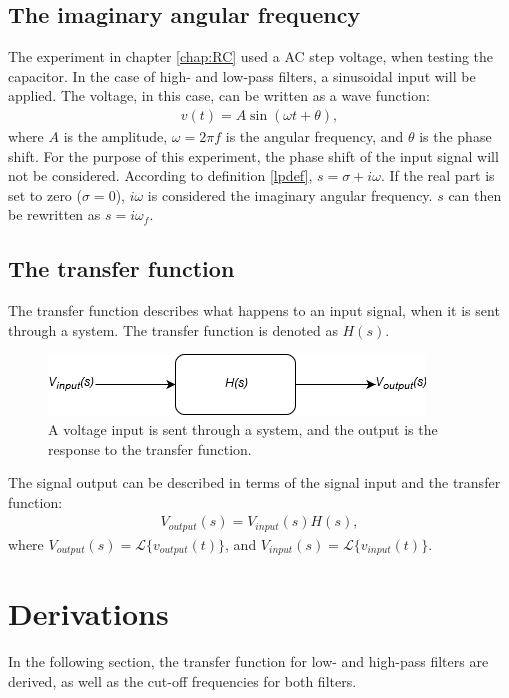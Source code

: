 \subsection{The imaginary angular frequency}\label{sub:imfreq}
The experiment in chapter \ref{chap:RC} used a AC step voltage, when testing the capacitor. In the case of high- and low-pass filters, a sinusoidal input will be applied. The voltage, in this case, can be written as a wave function:
\begin{align*}
v(t)=A\sin(\omega t+\theta),
\end{align*}
where $A$ is the amplitude, $\omega=2\pi f$ is the angular frequency, and $\theta$ is the phase shift. For the purpose of this experiment, the phase shift of the input signal will not be considered. According to definition \ref{lpdef}, $s=\sigma + i \omega$. If the real part is set to zero ($\sigma = 0$), $i \omega$ is considered the imaginary angular frequency. $s$ can then be rewritten as $s = i \omega_f$. \cite[p. 733 - 735]{bcircuit9}

\subsection{The transfer function} \label{sub:TTF}
The transfer function describes what happens to an input signal, when it is sent through a system. The transfer function is denoted as $H(s)$.
\\
\begin{figure}[H]
\center
\includegraphics[scale=0.6]{fig/img/transfer_function.png}
\caption{A voltage input is sent through a system, and the output is the response to the transfer function.}
\label{fig:transfer}
\end{figure}
\noindent
The signal output can be described in terms of the signal input and the transfer function:
\begin{align*}
V_{output}(s)=V_{input}(s)H(s),
\end{align*}
where $V_{output}(s)=\mathcal{L}\{v_{output}(t)\}$, and $V_{input}(s)=\mathcal{L}\{v_{input}(t)\}$.

\section{Derivations} \label{Derivations}
In the following section, the transfer function for low- and high-pass filters are derived, as well as the cut-off frequencies for both filters.

